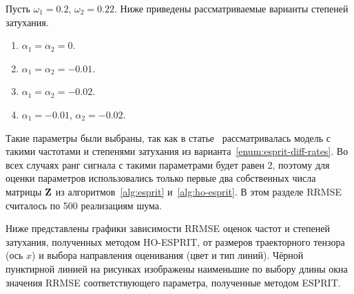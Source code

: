 \documentclass[specialist,
  substylefile=spbu_report.rtx,
subf,href,colorlinks=true, 12pt]{disser}
\theoremstyle{plain}
\theoremstyle{definition}
\theoremstyle{remark}
\begin{document}
Пусть $\omega_1 = 0.2$, $\omega_2 = 0.22$.
Ниже приведены рассматриваемые варианты степеней затухания.
\begin{enumerate}
  \item\label{enum:esprit-no-rates} $\alpha_1=\alpha_2=0$.
  \item\label{enum:esprit-smalleq-rates} $\alpha_1=\alpha_2=-0.01$.
  \item\label{enum:esprit-bigeq-rates} $\alpha_1=\alpha_2=-0.02$.
  \item\label{enum:esprit-diff-rates} $\alpha_1= -0.01$, $\alpha_2=-0.02$.
\end{enumerate}
Такие параметры были выбраны, так как в статье~\cite{hosvd-hooi-separation}
рассматривалась модель с такими частотами и степенями затухания из
варианта~\ref{enum:esprit-diff-rates}.
Во всех случаях ранг сигнала с такими параметрами будет равен 2, поэтому для оценки параметров
использовались только первые два собственных числа матрицы $\mathbf{Z}$ из алгоритмов~\ref{alg:esprit}
и~\ref{alg:ho-esprit}.
В этом разделе RRMSE считалось по 500 реализациям шума.

Ниже представлены графики зависимости RRMSE оценок частот и степеней затухания,
полученных методом HO-ESPRIT, от размеров траекторного тензора
(ось $x$) и выбора направления оценивания (цвет и тип линий).
Чёрной пунктирной линией на рисунках изображены наименьшие по выбору длины окна значения RRMSE
соответствующего параметра, полученные методом ESPRIT.
\end{document}
